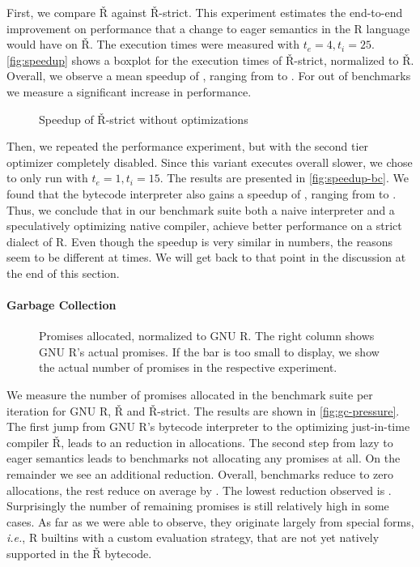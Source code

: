 \documentclass[review,nonacm,screen,acmsmall,anonymous=true]{acmart}
\renewcommand{\Rsh}{{\sf\v R}\xspace}
\newcommand{\Rshstrict}{{\sf\v R-strict}\xspace}
\newcommand{\ie}{\emph{i.e.},\xspace}
\begin{document}
First, we compare \Rsh against \Rshstrict. This experiment estimates the end-to-end
improvement on performance that a change to eager semantics in the R language
would have on \Rsh. The execution times were measured with $t_e = 4, t_i = 25$.
\autoref{fig:speedup} shows a boxplot for the execution times of \Rsh-strict,
normalized to \Rsh. Overall, we observe a mean speedup of
\speedupRshStrict, ranging from \speedupRshStrictMin to \speedupRshStrictMax.
For \speedupRshStrictSignificant out of \benchmarkSuiteSize benchmarks we measure a significant increase in performance.
%
\begin{figure}[h]
  \centering
  
  \caption{Speedup of \Rshstrict without optimizations}
  \label{fig:speedup-bc}
\end{figure}
%
Then, we repeated the performance experiment, but with the second tier
optimizer completely disabled. Since this variant executes overall \rshBCSlowdown
slower, we chose to only run with $t_e = 1, t_i = 15$.
The results are presented in \autoref{fig:speedup-bc}. We found that the bytecode
interpreter also gains a speedup of \speedupBCRshStrict, ranging from
\speedupBCRshStrictMin to \speedupBCRshStrictMax.
%
Thus, we conclude that in our benchmark suite both a naive interpreter and a speculatively
optimizing native compiler, achieve better performance on a strict dialect of R.
Even though the speedup is very similar in numbers, the reasons seem to be
different at times. We will get back to that point in the discussion at the end of
this section.

\paragraph{Garbage Collection}

\begin{figure}[h]
  \centering
  
  \caption{Promises allocated, normalized to GNU R. The right column shows GNU R's actual promises. If the bar is too small to display, we show the actual number of promises in the respective experiment.}
  \label{fig:gc-pressure}
\end{figure}

We measure the number of promises allocated in the
benchmark suite per iteration for GNU R, \Rsh and \Rsh-strict. The results are shown in
\autoref{fig:gc-pressure}. The first jump from GNU R's bytecode interpreter to
the optimizing just-in-time compiler \Rsh, leads to an \promiseAlocationReductionGnurRsh
reduction in allocations. The second step
from lazy to eager semantics leads to \promiseAlocationReductionRshStrictToZero
benchmarks not allocating any promises at all. On the remainder we see an additional
\promiseAlocationReductionRshStrict reduction.
Overall, \promiseAlocationReductionRshStrictToZero benchmarks reduce to zero
allocations, the rest reduce on average by \promiseAlocationReductionGnurRshStrict.
The lowest reduction observed is
\promiseAlocationReductionGnurRshStrictMin.
Surprisingly the number of remaining promises is
still relatively high in some cases. As far as we were able to observe, they
originate largely from special forms, \ie R builtins with a custom evaluation
strategy, that are not yet natively supported in the \Rsh bytecode.
\end{document}
